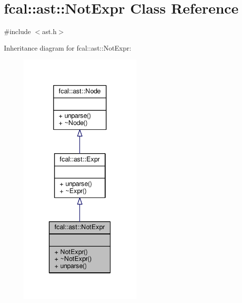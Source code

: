 \hypertarget{classfcal_1_1ast_1_1NotExpr}{}\section{fcal\+:\+:ast\+:\+:Not\+Expr Class Reference}
\label{classfcal_1_1ast_1_1NotExpr}


{\ttfamily \#include $<$ast.\+h$>$}



Inheritance diagram for fcal\+:\+:ast\+:\+:Not\+Expr\+:
\nopagebreak
\begin{figure}[H]
\begin{center}
\leavevmode
\includegraphics[width=174pt]{classfcal_1_1ast_1_1NotExpr__inherit__graph}
\end{center}
\end{figure}


